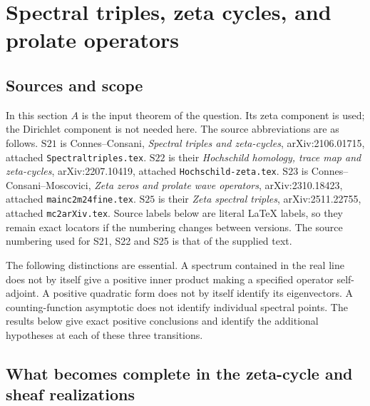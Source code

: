 \section{Spectral triples, zeta cycles, and prolate operators}
\label{sec:ACspectral}

\subsection{Sources and scope}
In this section \(A\) is the input theorem of the question.  Its zeta
component is used; the Dirichlet component is not needed here.  The source
abbreviations are as follows.  \(\mathrm{S21}\) is Connes--Consani,
\emph{Spectral triples and zeta-cycles}, arXiv:2106.01715, attached
\texttt{Spectraltriples.tex}.  \(\mathrm{S22}\) is their
\emph{Hochschild homology, trace map and zeta-cycles}, arXiv:2207.10419,
attached \texttt{Hochschild-zeta.tex}.  \(\mathrm{S23}\) is
Connes--Consani--Moscovici, \emph{Zeta zeros and prolate wave operators},
arXiv:2310.18423, attached \texttt{mainc2m24fine.tex}.
\(\mathrm{S25}\) is their \emph{Zeta spectral triples},
arXiv:2511.22755, attached \texttt{mc2arXiv.tex}.  Source labels below are
literal LaTeX labels, so they remain exact locators if the numbering changes
between versions.  The source numbering used for S21, S22 and S25 is that
of the supplied text.

The following distinctions are essential.  A spectrum contained in the
real line does not by itself give a positive inner product making a
specified operator self-adjoint.  A positive quadratic form does not by
itself identify its eigenvectors.  A counting-function asymptotic does
not identify individual spectral points.  The results below give exact
positive conclusions and identify the additional hypotheses at each of
these three transitions.

\subsection{What becomes complete in the zeta-cycle and sheaf realizations}

